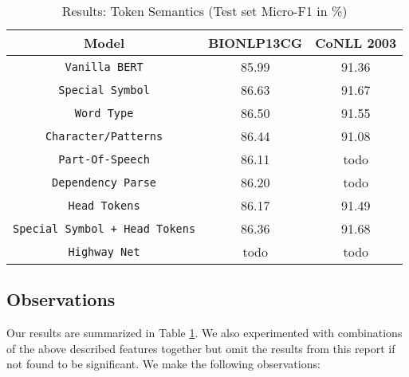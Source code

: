 \begin{table}[h!]
\centering
\begin{tabular}{|c|c|c|}\hline
	\textbf{Model} & \textbf{BIONLP13CG} & \textbf{CoNLL 2003}\\\hline
	\texttt{Vanilla BERT} & 85.99 & 91.36\\\hline
	\texttt{Special Symbol} & 86.63 & 91.67\\\hline
	\texttt{Word Type} & 86.50 & 91.55\\\hline
	\texttt{Character/Patterns} & 86.44 & 91.08\\\hline
	\texttt{Part-Of-Speech} & 86.11 & todo\\\hline
	\texttt{Dependency Parse} & 86.20 & todo\\\hline
	\texttt{Head Tokens} & 86.17 & 91.49\\\hline
	\texttt{Special Symbol + Head Tokens} & 86.36 & 91.68\\\hline
	\texttt{Highway Net} & todo & todo\\\hline
	\end{tabular}
    \caption{Results: Token Semantics (Test set Micro-F1 in \%)}
    \label{tab:res_token_semantics}
\end{table}

\subsection{Observations}
Our results are summarized in Table \ref{tab:res_token_semantics}. We also experimented with combinations of the above described features together but omit the results from this report if not found to be significant. We make the following observations:

